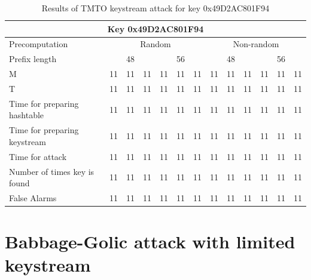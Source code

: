 \begin{table}[ht!]
\begin{center}
\begin{tabular}{|p{3cm}||c|c|c|l|l|l|l|l|l|l|l|l|}
\hline
\multicolumn{13}{|c|}{\textbf{Key 0x49D2AC801F94}} \\ \hline
Precomputation & \multicolumn{6}{|c|}{Random} & \multicolumn{6}{|c|}{Non-random} \\ \hline
Prefix length& \multicolumn{3}{|c|}{48} & \multicolumn{3}{|c|}{56} & \multicolumn{3}{|c|}{48} & \multicolumn{3}{|c|}{56} \\ \hline \hline

M		&	11 &	11 &	11 &	11 &	11 &	11 &	11 & 11 &	11 &	11 &	11 &	11 \\ \hline
T	  &	11 &	11 &	11 &	11 &	11 &	11 &	11 & 11 &	11 &	11 &	11 &	11 \\ \hline
Time for preparing hashtable		&	11 &	11 &	11 &	11 &	11 &	11 &	11 & 11 &	11 &	11 &	11 &	11 \\ \hline
Time for preparing keystream		&	11 &	11 &	11 &	11 &	11 &	11 &	11 & 11 &	11 &	11 &	11 &	11 \\ \hline
Time for attack								&	11 &	11 &	11 &	11 &	11 &	11 &	11 & 11 &	11 &	11 &	11 &	11 \\ \hline
Number of times key is found	&	11 &	11 &	11 &	11 &	11 &	11 &	11 & 11 &	11 &	11 &	11 &	11 \\ \hline
False Alarms									&	11 &	11 &	11 &	11 &	11 &	11 &	11 & 11 &	11 &	11 &	11 &	11 \\ \hline
\end{tabular}
\end{center}
\caption{Results of TMTO keystream attack for key 0x49D2AC801F94}
\label{tab:keystream-attack-results}
\end{table}

\section{Babbage-Golic attack with limited keystream}

